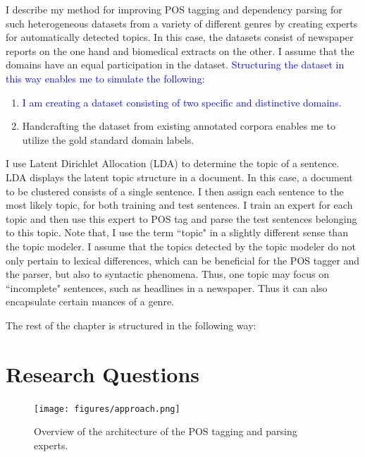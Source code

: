 I describe my method for improving POS tagging and dependency parsing for such heterogeneous datasets from a variety of different genres by creating experts for automatically detected topics. In this case, the datasets consist of newspaper reports on the one hand and biomedical extracts on the other. I assume that the domains have an equal participation in the dataset. \textcolor{blue}{Structuring the dataset in this way enables me to simulate the following:}
\begin{enumerate}
    \item  \textcolor{blue}{I am creating a dataset consisting of two specific and distinctive domains.}
    \item Handcrafting the dataset from existing annotated corpora enables me to utilize the gold standard domain labels. 
\end{enumerate}
I use Latent Dirichlet Allocation (LDA) to determine the topic of a sentence. LDA displays the latent topic structure in a document. In this case, a document to be clustered consists of a single sentence. I then assign each sentence to the most likely topic, for both training and test sentences. I train an expert for each topic and then use this expert to POS tag and parse the test sentences belonging to this topic. Note that, I use the term ``topic" in a slightly different sense than the topic modeler. I assume that the topics detected by the topic modeler do not only pertain to lexical differences, which can be beneficial for the POS tagger and the parser, but also to syntactic phenomena. Thus, one topic may focus on ``incomplete" sentences, such as headlines in a newspaper. Thus it can also encapsulate certain nuances of a genre. 

The rest of the chapter is structured in the following way: 


\section{Research Questions}\label{sec:quest}

\begin{figure}[t]
    \centering
    \texttt{[image: figures/approach.png]}
 \caption{Overview of the architecture of the POS tagging and parsing experts.}\label{fig:architecture0}
 \end{figure}

